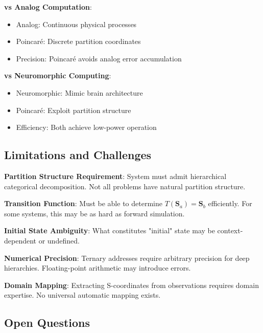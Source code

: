 \documentclass[twocolumn,10pt]{article}
\begin{document}
\textbf{vs Analog Computation}:
\begin{itemize}
\item Analog: Continuous physical processes
\item Poincaré: Discrete partition coordinates
\item Precision: Poincaré avoids analog error accumulation
\end{itemize}

\textbf{vs Neuromorphic Computing}:
\begin{itemize}
\item Neuromorphic: Mimic brain architecture
\item Poincaré: Exploit partition structure
\item Efficiency: Both achieve low-power operation
\end{itemize}

\subsection{Limitations and Challenges}

\textbf{Partition Structure Requirement}: System must admit hierarchical categorical decomposition. Not all problems have natural partition structure.

\textbf{Transition Function}: Must be able to determine $T(\mathbf{S}_a) = \mathbf{S}_b$ efficiently. For some systems, this may be as hard as forward simulation.

\textbf{Initial State Ambiguity}: What constitutes "initial" state may be context-dependent or undefined.

\textbf{Numerical Precision}: Ternary addresses require arbitrary precision for deep hierarchies. Floating-point arithmetic may introduce errors.

\textbf{Domain Mapping}: Extracting S-coordinates from observations requires domain expertise. No universal automatic mapping exists.

\subsection{Open Questions}
\end{document}
